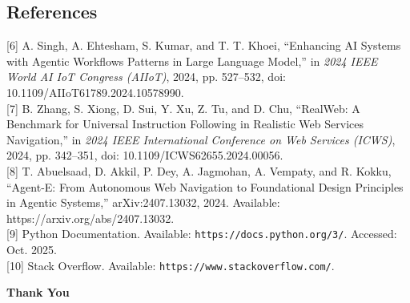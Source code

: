 \documentclass{beamer}
\begin{document}
\begin{frame}
\section{References} 
\footnotesize{

[6] A. Singh, A. Ehtesham, S. Kumar, and T. T. Khoei, “Enhancing AI Systems with Agentic Workflows Patterns in Large Language Model,” in \textit{2024 IEEE World AI IoT Congress (AIIoT)}, 2024, pp. 527–532, doi: 10.1109/AIIoT61789.2024.10578990. \\

[7] B. Zhang, S. Xiong, D. Sui, Y. Xu, Z. Tu, and D. Chu, “RealWeb: A Benchmark for Universal Instruction Following in Realistic Web Services Navigation,” in \textit{2024 IEEE International Conference on Web Services (ICWS)}, 2024, pp. 342–351, doi: 10.1109/ICWS62655.2024.00056. \\

[8] T. Abuelsaad, D. Akkil, P. Dey, A. Jagmohan, A. Vempaty, and R. Kokku, “Agent-E: From Autonomous Web Navigation to Foundational Design Principles in Agentic Systems,” arXiv:2407.13032, 2024. Available: https://arxiv.org/abs/2407.13032. \\

[9] Python Documentation. Available: \texttt{https://docs.python.org/3/}. Accessed: Oct. 2025. \\

[10] Stack Overflow. Available: \texttt{https://www.stackoverflow.com/}. \\

}
\end{frame}


\begin{frame}
\centering
\Huge \textbf{Thank You}
\end{frame}
\end{document}
